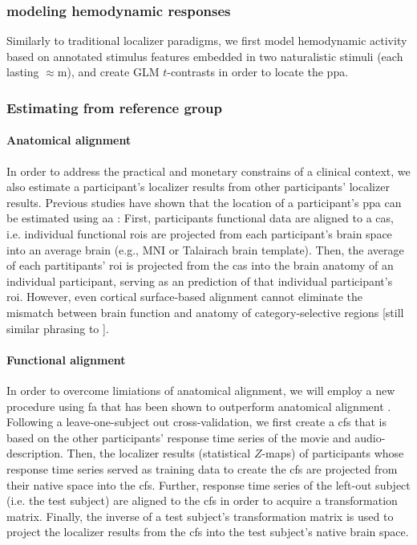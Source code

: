 \subsubsection{modeling hemodynamic responses}
%
Similarly to traditional localizer paradigms, we first model hemodynamic
activity based on annotated stimulus features embedded in two naturalistic
stimuli (each lasting $\approx$\unit[120]{m}), and create GLM $t$-contrasts in
order to locate the \ac{ppa}.


\subsubsection{Estimating from reference group}

\paragraph{Anatomical alignment}
In order to address the practical and monetary constrains of a clinical context,
we also estimate a participant's localizer results from other participants'
localizer results.
Previous studies have shown that the location of a participant's \ac{ppa} can be
estimated using \ac{aa} \citep{frost2012measuring, rosenke2021probabilistic,
weiner2018defining, zhen2017quantifying}:
%
First, participants functional data are aligned to a \ac{cas}, i.e. individual
functional \acp{roi} are projected from each participant's brain space into an
average brain (e.g., MNI or Talairach brain template).
%
Then, the average of each partitipants' \ac{roi} is projected from the \ac{cas}
into the brain anatomy of an individual participant, serving as an prediction of
that individual participant's \ac{roi}.
%
However, even cortical surface-based alignment \citep{fischl2012freesurfer}
cannot eliminate the mismatch between brain function and anatomy of
category-selective regions \citep{duncan2009consistency, frost2012measuring,
weiner2018defining, weiner2014mid} [still similar phrasing to
\citep{feilong2018reliable}].


\paragraph{Functional alignment}
In order to overcome limiations of anatomical alignment, we will employ a new
procedure using \ac{fa} that has been shown to outperform anatomical alignment
\citep{haxby2020hyperalignment, bazeille2021empirical}.
%
%
Following a leave-one-subject out cross-validation, we first create a \ac{cfs}
that is based on the other participants' response time series of the movie and
audio-description.
%
Then, the localizer results (statistical $Z$-maps) of participants whose
response time series served as training data to create the \ac{cfs} are
projected from their native space into the \ac{cfs}.
%
Further, response time series of the left-out subject (i.e. the test subject) are
aligned to the \ac{cfs} in order to acquire a transformation matrix.
%
Finally, the inverse of a test subject's transformation matrix is used to
project the localizer results from the \ac{cfs} into the test subject's native
brain space.


